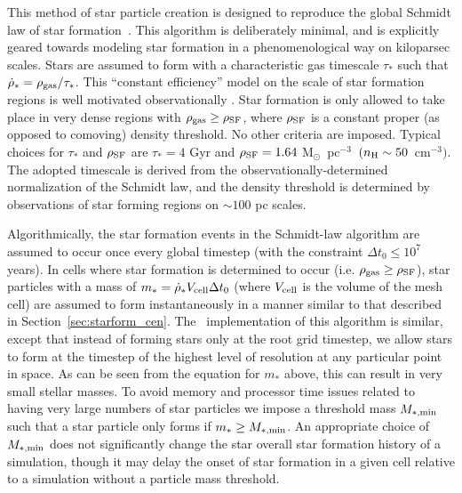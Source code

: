 This method of star particle creation is designed to reproduce
the global Schmidt law of star formation~\citep{2003ApJ...590L...1K,
  1959ApJ...129..243S}.  This algorithm is deliberately minimal, and
is explicitly geared towards modeling star formation in a
phenomenological way on kiloparsec scales.  Stars are assumed to form
with a characteristic gas timescale $\tau_*$ such that $\dot{\rho}_* =
\rho_{\rm gas}/\tau_*$. 
This ``constant
efficiency'' model on the scale of star formation regions is well
motivated observationally
\citep{1996AJ....112.1903Y,2002ApJ...569..157W}.  Star formation is
only allowed to take place in very dense regions with $\rho_{\rm gas}
\geq \rho_{\rm SF}$, where $\rho_{\rm SF}$ is a constant proper (as
opposed to comoving) density threshold.  No other criteria are
imposed.  Typical choices for $\tau_*$ and $\rho_{\rm SF}$ are $\tau_*
= 4$ Gyr and $\rho_{\rm SF} = 1.64~$M$_\odot$~pc$^{-3}$~$(n_{\rm H}
\sim 50$~cm$^{-3})$.  The adopted timescale is derived from the
observationally-determined normalization of the Schmidt law, and the
density threshold is determined by observations of star forming
regions on $\sim 100$ pc scales.

Algorithmically, the star formation events in the Schmidt-law algorithm are
assumed to occur once every global timestep (with the constraint $\Delta t_0 \leq
10^7$ years).
In cells where star formation is determined to occur (i.e. $\rho_{\rm
  gas} \geq \rho_{\rm SF}$), star particles with a mass of $m_* =
\dot{\rho}_* V_{\rm cell} \Delta t_0$ (where $V_{\rm cell}$ is the
volume of the mesh cell) are assumed to form instantaneously in a
manner similar to that described in Section~\ref{sec:starform_cen}.
The \enzo\ implementation of this algorithm is similar, except that
instead of forming stars only at the root grid timestep, we allow
stars to form at the timestep of the highest level of resolution at
any particular point in space.  As can be seen from the equation for
$m_*$ above, this can result in very small stellar masses.  To avoid
memory and processor time issues related to having very large numbers
of star particles we impose a threshold mass $M_{\rm *,min}$ such that
a star particle only forms if $m_* \geq M_{\rm *,min}$.  An
appropriate choice of $M_{\rm *,min}$ does not significantly change
the star overall star formation history of a simulation, though it may
delay the onset of star formation in a given cell relative to a
simulation without a particle mass threshold.

